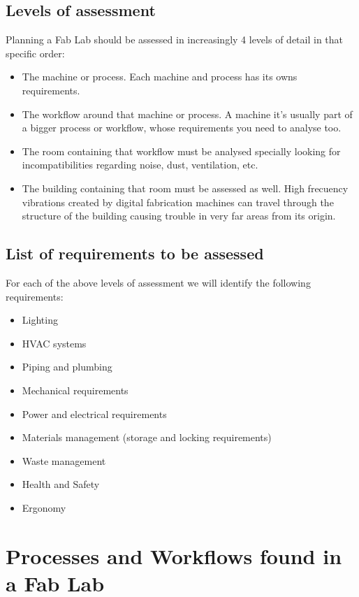 \documentclass[a4paper,12pt,titlepage]{article}
\begin{document}
\subsection{Levels of assessment}
Planning a Fab Lab should be assessed in increasingly 4 levels of detail in that specific order:
\begin{itemize}
\item The machine or process. Each machine and process has its owns requirements.
\item The workflow around that machine or process. A machine it's usually part of a bigger process or workflow, whose requirements you need to analyse too.
\item The room containing that workflow must be analysed specially looking for incompatibilities regarding noise, dust, ventilation, etc.
\item The building containing that room must be assessed as well. High frecuency vibrations created by digital fabrication machines can travel through the structure of the building causing trouble in very far areas from its origin.
\end{itemize}


\subsection{List of requirements to be assessed}
For each of the above levels of assessment we will identify the following requirements:
\begin{itemize}
\item Lighting
\item HVAC systems
\item Piping and plumbing
\item Mechanical requirements
\item Power and electrical requirements
\item Materials management (storage and locking requirements)
\item Waste management
\item Health and Safety
\item Ergonomy
\end{itemize}

\clearpage
  
\section{Processes and Workflows found in a Fab Lab}
\end{document}
